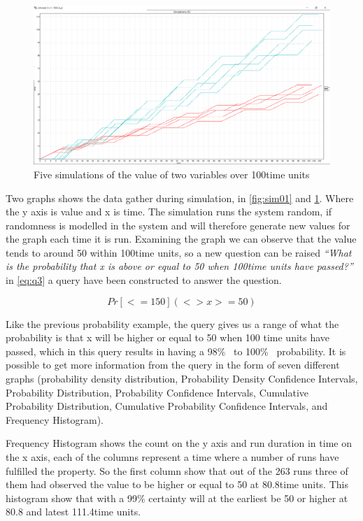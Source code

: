 \begin{figure}[!h]
	\includegraphics[width=\textwidth]{graphics/showcase02.png}
	\caption{Five simulations of the value of two variables  over 100time units}
	\label{fig:sim02}
\end{figure}

Two graphs shows the data gather during simulation, in \cref{fig:sim01} and \cref{fig:sim02}. Where the y axis is value and x is time. The simulation runs the system random, if randomness is modelled in the system and will therefore generate new values for the graph each time it is run. Examining the graph we can observe that the value  tends to around 50 within 100time units, so a new question can be raised \textit{``What is the probability that x is above or equal to 50 when 100time units have passed?''} in \cref{eq:q3} a query have been constructed to answer the question.

\begin{equation}\label{eq:q3}
Pr[<=150](<> x >= 50)
\end{equation}

Like the previous probability example, the query gives us a range of what the probability is that x will be higher or equal to 50 when 100 time units have passed, which in this query results in having a 98\%~ to 100\%~ probability. It is possible to get more information from the query in the form of seven different graphs (probability density distribution, Probability Density Confidence Intervals, Probability Distribution, Probability Confidence Intervals, Cumulative Probability Distribution, Cumulative Probability Confidence Intervals, and Frequency Histogram). 

Frequency Histogram shows the count on the y axis and run duration in time on the x axis, each of the columns represent a time where a number of runs have fulfilled the property. So the first column show that out of the 263 runs three of them had observed the value  to be higher or equal to 50 at 80.8time units. This histogram show that with a 99\% certainty  will at the earliest be 50 or higher at 80.8 and latest 111.4time units.

